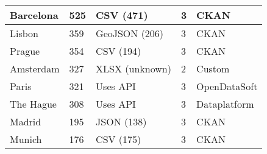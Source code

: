 \begin{table}[!ht]
\begin{tabular}{|lllll|}
    \multicolumn{1}{|l|}{Barcelona}                   & \multicolumn{1}{|l|}{525}                                              & \multicolumn{1}{|l|}{CSV (471)}                                                       & \multicolumn{1}{|l|}{3}        & \multicolumn{1}{|l|}{CKAN}                                   \\ \hline
    \multicolumn{1}{|l|}{Lisbon}                      & \multicolumn{1}{|l|}{359}                                              & \multicolumn{1}{|l|}{GeoJSON (206)}                                                   & \multicolumn{1}{|l|}{3}        & \multicolumn{1}{|l|}{CKAN}                                   \\ \hline
    \multicolumn{1}{|l|}{Prague}                      & \multicolumn{1}{|l|}{354}                                              & \multicolumn{1}{|l|}{CSV (194)}                                                       & \multicolumn{1}{|l|}{3}        & \multicolumn{1}{|l|}{CKAN}                                   \\ \hline
    \multicolumn{1}{|l|}{Amsterdam}                   & \multicolumn{1}{|l|}{327}                                              & \multicolumn{1}{|l|}{XLSX (unknown)}                                                  & \multicolumn{1}{|l|}{2}        & \multicolumn{1}{|l|}{Custom}                                   \\ \hline
    \multicolumn{1}{|l|}{Paris}                       & \multicolumn{1}{|l|}{321}                                              & \multicolumn{1}{|l|}{Uses \acs{API}}                                                  & \multicolumn{1}{|l|}{3}        & \multicolumn{1}{|l|}{OpenDataSoft}                                   \\ \hline
    \multicolumn{1}{|l|}{The Hague}                   & \multicolumn{1}{|l|}{308}                                              & \multicolumn{1}{|l|}{Uses \acs{API}}                                                  & \multicolumn{1}{|l|}{3}        & \multicolumn{1}{|l|}{Dataplatform}                                   \\ \hline
    \multicolumn{1}{|l|}{Madrid}                      & \multicolumn{1}{|l|}{195}                                              & \multicolumn{1}{|l|}{JSON (138)}                                                      & \multicolumn{1}{|l|}{3}        & \multicolumn{1}{|l|}{CKAN}                                   \\ \hline
    \multicolumn{1}{|l|}{Munich}                      & \multicolumn{1}{|l|}{176}                                              & \multicolumn{1}{|l|}{CSV (175)}                                                       & \multicolumn{1}{|l|}{3}        & \multicolumn{1}{|l|}{CKAN}                                   \\ \hline

\end{tabular}
\end{table}
